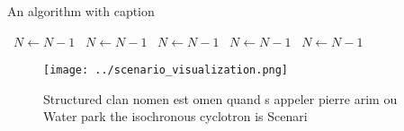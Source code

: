 \documentclass[a4paper]{article}
\begin{document}
\begin{algorithm}
\caption{An algorithm with caption}
\begin{algorithmic}
\    \State $N \gets N - 1$
\    \State $N \gets N - 1$
\    \State $N \gets N - 1$
\    \State $N \gets N - 1$
\    \State $N \gets N - 1$
\EndWhile
\end{algorithmic}
\end{algorithm}

\begin{figure}
\centering
\texttt{[image: ../scenario\_visualization.png]}
\caption{Structured clan nomen est omen quand s appeler pierre arim ou Water park the isochronous cyclotron is Scenari
}
\end{figure}
 
\end{document}
